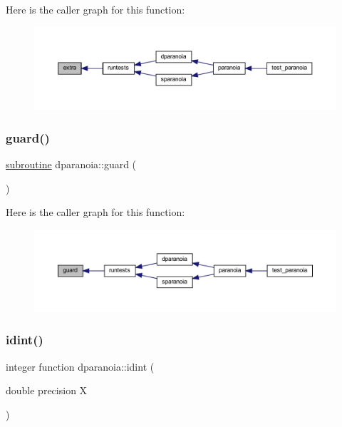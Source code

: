 Here is the caller graph for this function\+:
\nopagebreak
\begin{figure}[H]
\begin{center}
\leavevmode
\includegraphics[width=350pt]{dparanoia_8f90_a8b0cecca050456b522805e7a3ebe3398_icgraph}
\end{center}
\end{figure}
\mbox{\label{dparanoia_8f90_a50f1e7cdd1eb06f040fb16cc2e7c65e7}} 
\subsubsection{\texorpdfstring{guard()}{guard()}}
{\footnotesize\ttfamily \hyperlink{M__stopwatch_83_8txt_acfbcff50169d691ff02d4a123ed70482}{subroutine} dparanoia\+::guard (\begin{DoxyParamCaption}{ }\end{DoxyParamCaption})}

Here is the caller graph for this function\+:
\nopagebreak
\begin{figure}[H]
\begin{center}
\leavevmode
\includegraphics[width=350pt]{dparanoia_8f90_a50f1e7cdd1eb06f040fb16cc2e7c65e7_icgraph}
\end{center}
\end{figure}
\mbox{\label{dparanoia_8f90_a86b4fbb4f2e0083655b4f87fea7c9774}} 
\subsubsection{\texorpdfstring{idint()}{idint()}}
{\footnotesize\ttfamily integer function dparanoia\+::idint (\begin{DoxyParamCaption}\item[{double precision}]{X }\end{DoxyParamCaption})}

